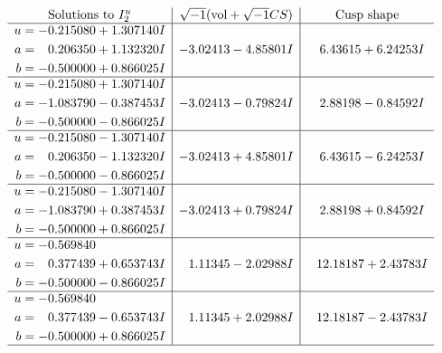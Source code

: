 \documentclass[1p]{elsarticle_modified}
\theoremstyle{definition}
\newcommand{\I}{\sqrt{-1}}
\begin{document}
$$\begin{array}{c|c|c}  
\text{Solutions to }I^u_{2}& \I (\text{vol} + \sqrt{-1}CS) & \text{Cusp shape}\\
 \hline 
\begin{aligned}
u &= -0.215080 + 1.307140 I \\
a &= \phantom{-}0.206350 + 1.132320 I \\
b &= -0.500000 + 0.866025 I\end{aligned}
 & -3.02413 - 4.85801 I & \phantom{-}6.43615 + 6.24253 I \\ \hline\begin{aligned}
u &= -0.215080 + 1.307140 I \\
a &= -1.083790 - 0.387453 I \\
b &= -0.500000 - 0.866025 I\end{aligned}
 & -3.02413 - 0.79824 I & \phantom{-}2.88198 - 0.84592 I \\ \hline\begin{aligned}
u &= -0.215080 - 1.307140 I \\
a &= \phantom{-}0.206350 - 1.132320 I \\
b &= -0.500000 - 0.866025 I\end{aligned}
 & -3.02413 + 4.85801 I & \phantom{-}6.43615 - 6.24253 I \\ \hline\begin{aligned}
u &= -0.215080 - 1.307140 I \\
a &= -1.083790 + 0.387453 I \\
b &= -0.500000 + 0.866025 I\end{aligned}
 & -3.02413 + 0.79824 I & \phantom{-}2.88198 + 0.84592 I \\ \hline\begin{aligned}
u &= -0.569840\phantom{ +0.000000I} \\
a &= \phantom{-}0.377439 + 0.653743 I \\
b &= -0.500000 - 0.866025 I\end{aligned}
 & \phantom{-}1.11345 - 2.02988 I & \phantom{-}12.18187 + 2.43783 I \\ \hline\begin{aligned}
u &= -0.569840\phantom{ +0.000000I} \\
a &= \phantom{-}0.377439 - 0.653743 I \\
b &= -0.500000 + 0.866025 I\end{aligned}
 & \phantom{-}1.11345 + 2.02988 I & \phantom{-}12.18187 - 2.43783 I\\
 \hline 
 \end{array}$$\newpage
\end{document}
